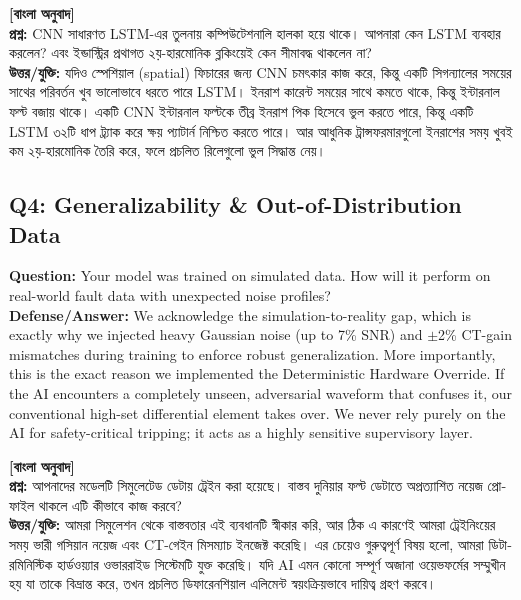 \documentclass[12pt]{article}
\begin{document}
\begin{bengali}
\textbf{[বাংলা অনুবাদ]} \\
\textbf{প্রশ্ন:} CNN সাধারণত LSTM-এর তুলনায় কম্পিউটেশনালি হালকা হয়ে থাকে। আপনারা কেন LSTM ব্যবহার করলেন? এবং ইন্ডাস্ট্রির প্রথাগত ২য়-হারমোনিক ব্লকিংয়েই কেন সীমাবদ্ধ থাকলেন না? \\
\textbf{উত্তর/যুক্তি:} যদিও স্পেশিয়াল (spatial) ফিচারের জন্য CNN চমৎকার কাজ করে, কিন্তু একটি সিগন্যালের সময়ের সাথের পরিবর্তন খুব ভালোভাবে ধরতে পারে LSTM। ইনরাশ কারেন্ট সময়ের সাথে কমতে থাকে, কিন্তু ইন্টারনাল ফল্ট বজায় থাকে। একটি CNN ইন্টারনাল ফল্টকে তীব্র ইনরাশ পিক হিসেবে ভুল করতে পারে, কিন্তু একটি LSTM ৩২টি ধাপ ট্র্যাক করে ক্ষয় প্যাটার্ন নিশ্চিত করতে পারে। আর আধুনিক ট্রান্সফরমারগুলো ইনরাশের সময় খুবই কম ২য়-হারমোনিক তৈরি করে, ফলে প্রচলিত রিলেগুলো ভুল সিদ্ধান্ত নেয়।
\end{bengali}

\subsection*{Q4: Generalizability \& Out-of-Distribution Data}
\textbf{Question:} Your model was trained on simulated data. How will it perform on real-world fault data with unexpected noise profiles? \\
\textbf{Defense/Answer:} We acknowledge the simulation-to-reality gap, which is exactly why we injected heavy Gaussian noise (up to 7\% SNR) and $\pm$2\% CT-gain mismatches during training to enforce robust generalization. More importantly, this is the exact reason we implemented the Deterministic Hardware Override. If the AI encounters a completely unseen, adversarial waveform that confuses it, our conventional high-set differential element takes over. We never rely purely on the AI for safety-critical tripping; it acts as a highly sensitive supervisory layer.

\begin{bengali}
\textbf{[বাংলা অনুবাদ]} \\
\textbf{প্রশ্ন:} আপনাদের মডেলটি সিমুলেটেড ডেটায় ট্রেইন করা হয়েছে। বাস্তব দুনিয়ার ফল্ট ডেটাতে অপ্রত্যাশিত নয়েজ প্রোফাইল থাকলে এটি কীভাবে কাজ করবে? \\
\textbf{উত্তর/যুক্তি:} আমরা সিমুলেশন থেকে বাস্তবতার এই ব্যবধানটি স্বীকার করি, আর ঠিক এ কারণেই আমরা ট্রেইনিংয়ের সময় ভারী গসিয়ান নয়েজ এবং CT-গেইন মিসম্যাচ ইনজেক্ট করেছি। এর চেয়েও গুরুত্বপূর্ণ বিষয় হলো, আমরা ডিটারমিনিস্টিক হার্ডওয়্যার ওভাররাইড সিস্টেমটি যুক্ত করেছি। যদি AI এমন কোনো সম্পূর্ণ অজানা ওয়েভফর্মের সম্মুখীন হয় যা তাকে বিভ্রান্ত করে, তখন প্রচলিত ডিফারেনশিয়াল এলিমেন্ট স্বয়ংক্রিয়ভাবে দায়িত্ব গ্রহণ করবে।
\end{bengali}
\end{document}
